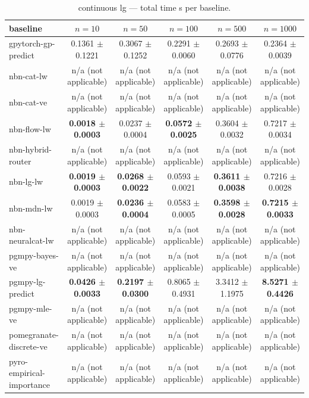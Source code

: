 \begin{table}[h]
\centering
\caption{continuous lg — total time s per baseline.}
\label{tab:continuous_lg_total_time_s}
\begin{tabular}{lccccc}
\toprule
baseline & $n=10$ & $n=50$ & $n=100$ & $n=500$ & $n=1000$ \\
\midrule
gpytorch-gp-predict & 0.1361 $\pm$ 0.1221 & 0.3067 $\pm$ 0.1252 & 0.2291 $\pm$ 0.0060 & 0.2693 $\pm$ 0.0776 & 0.2364 $\pm$ 0.0039 \\
nbn-cat-lw & n/a (not applicable) & n/a (not applicable) & n/a (not applicable) & n/a (not applicable) & n/a (not applicable) \\
nbn-cat-ve & n/a (not applicable) & n/a (not applicable) & n/a (not applicable) & n/a (not applicable) & n/a (not applicable) \\
nbn-flow-lw & \textbf{0.0018 $\pm$ 0.0003} & 0.0237 $\pm$ 0.0004 & \textbf{0.0572 $\pm$ 0.0025} & 0.3604 $\pm$ 0.0032 & 0.7217 $\pm$ 0.0034 \\
nbn-hybrid-router & n/a (not applicable) & n/a (not applicable) & n/a (not applicable) & n/a (not applicable) & n/a (not applicable) \\
nbn-lg-lw & \textbf{0.0019 $\pm$ 0.0003} & \textbf{0.0268 $\pm$ 0.0022} & 0.0593 $\pm$ 0.0021 & \textbf{0.3611 $\pm$ 0.0038} & 0.7216 $\pm$ 0.0028 \\
nbn-mdn-lw & 0.0019 $\pm$ 0.0003 & \textbf{0.0236 $\pm$ 0.0004} & 0.0583 $\pm$ 0.0005 & \textbf{0.3598 $\pm$ 0.0028} & \textbf{0.7215 $\pm$ 0.0033} \\
nbn-neuralcat-lw & n/a (not applicable) & n/a (not applicable) & n/a (not applicable) & n/a (not applicable) & n/a (not applicable) \\
pgmpy-bayes-ve & n/a (not applicable) & n/a (not applicable) & n/a (not applicable) & n/a (not applicable) & n/a (not applicable) \\
pgmpy-lg-predict & \textbf{0.0426 $\pm$ 0.0033} & \textbf{0.2197 $\pm$ 0.0300} & 0.8065 $\pm$ 0.4931 & 3.3412 $\pm$ 1.1975 & \textbf{8.5271 $\pm$ 0.4426} \\
pgmpy-mle-ve & n/a (not applicable) & n/a (not applicable) & n/a (not applicable) & n/a (not applicable) & n/a (not applicable) \\
pomegranate-discrete-ve & n/a (not applicable) & n/a (not applicable) & n/a (not applicable) & n/a (not applicable) & n/a (not applicable) \\
pyro-empirical-importance & n/a (not applicable) & n/a (not applicable) & n/a (not applicable) & n/a (not applicable) & n/a (not applicable) \\
\bottomrule
\end{tabular}
\end{table}


